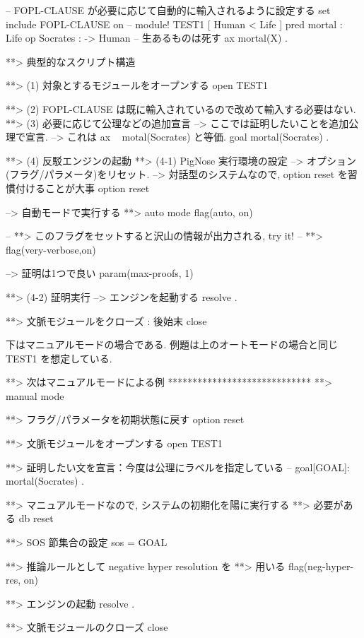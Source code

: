 \begin{vvtm}
\begin{examplev}
-- FOPL-CLAUSE が必要に応じて自動的に輸入されるように設定する
set include FOPL-CLAUSE on
-- 
module! TEST1 {
  [ Human < Life ]
  pred mortal : Life
  op Socrates : -> Human
  -- 生あるものは死す
  ax \A[X:Life] mortal(X) .
}

**>  典型的なスクリプト構造

**> (1) 対象とするモジュールをオープンする
open TEST1

**> (2) FOPL-CLAUSE は既に輸入されているので改めて輸入する必要はない.
**> (3) 必要に応じて公理などの追加宣言
-->     ここでは証明したいことを追加公理で宣言.
-->     これは ax ~ motal(Socrates) と等価.
goal mortal(Socrates) .

**> (4) 反駁エンジンの起動
**> (4-1) PigNose 実行環境の設定
-->       オプション(フラグ/パラメータ)をリセット.
-->       対話型のシステムなので, option reset を習慣付けることが大事
option reset

-->        自動モードで実行する
**> auto mode
flag(auto, on)

-- **> このフラグをセットすると沢山の情報が出力される, try it!
-- **> flag(very-verbose,on)

-->         証明は1つで良い
param(max-proofs, 1)

**> (4-2) 証明実行
-->       エンジンを起動する
resolve .

**> 文脈モジュールをクローズ : 後始末
close
\end{examplev}
\end{vvtm}

下はマニュアルモードの場合である. 例題は上のオートモードの場合と同じ
TEST1 を想定している. 

\begin{vvtm}
\begin{examplev}

**> 次はマニュアルモードによる例 *****************************
**> manual mode

**> フラグ/パラメータを初期状態に戻す
option reset

**> 文脈モジュールをオープンする
open TEST1

**> 証明したい文を宣言：今度は公理にラベルを指定している
-- 
goal[GOAL]: mortal(Socrates) .

**> マニュアルモードなので, システムの初期化を陽に実行する
**> 必要がある
db reset

**> SOS 節集合の設定
sos = {GOAL}

**> 推論ルールとして negative hyper resolution を
**> 用いる
flag(neg-hyper-res, on)

**> エンジンの起動
resolve .

**> 文脈モジュールのクローズ
close
\end{examplev}
\end{vvtm}

